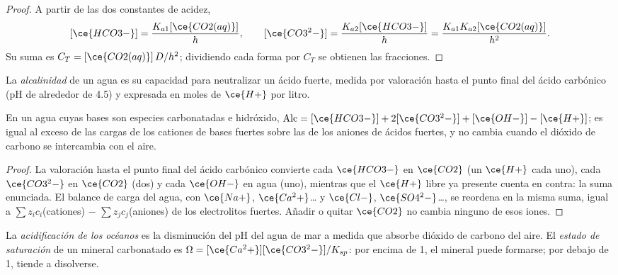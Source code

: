 \begin{proof}
A partir de las dos constantes de acidez,
\[
  [\ce{HCO3-}] = \frac{K_{a1}[\ce{CO2(aq)}]}{h}, \qquad [\ce{CO3^2-}] = \frac{K_{a2}[\ce{HCO3-}]}{h} = \frac{K_{a1}K_{a2}[\ce{CO2(aq)}]}{h^2}.
\]
Su suma es $C_T = [\ce{CO2(aq)}]\,D/h^2$; dividiendo cada forma por $C_T$ se obtienen las fracciones.
\end{proof}

\begin{definition}[Alcalinidad]\label{def:b3:environmental-toxicology:alkalinity}
La \emph{alcalinidad} de un agua es su capacidad para neutralizar
un ácido fuerte, medida por valoración hasta el punto final del ácido carbónico (pH de alrededor
de 4.5) y expresada en moles de $\ce{H+}$ por litro.
\end{definition}

\begin{proposition}\label{prop:b3:environmental-toxicology:alkalinity}
En un agua cuyas bases son especies carbonatadas e hidróxido,
$\mathrm{Alc} = [\ce{HCO3-}] + 2[\ce{CO3^2-}] + [\ce{OH-}] - [\ce{H+}]$; es igual al exceso de las cargas de los cationes de bases fuertes
sobre las de los aniones de ácidos fuertes, y no cambia cuando el dióxido de carbono
se intercambia con el aire.
\end{proposition}

\begin{proof}
La valoración hasta el punto final del ácido carbónico convierte cada $\ce{HCO3-}$ en $\ce{CO2}$ (un $\ce{H+}$ cada uno),
cada $\ce{CO3^2-}$ en $\ce{CO2}$ (dos) y cada $\ce{OH-}$ en agua (uno), mientras que el $\ce{H+}$ libre ya presente
cuenta en contra: la suma enunciada. El balance de carga del agua, con
$\ce{Na+}$, $\ce{Ca^2+}$\dots{} y $\ce{Cl-}$, $\ce{SO4^2-}$\dots, se reordena en la misma suma, igual a $\sum z_i c_i$(cationes) $-$ $\sum z_jc_j$(aniones)
de los electrolitos fuertes. Añadir o quitar $\ce{CO2}$ no cambia ninguno de esos iones.
\end{proof}

\begin{definition}\label{def:b3:environmental-toxicology:acidification}
La \emph{acidificación de los océanos} es la disminución del
pH del agua de mar a medida que absorbe dióxido de carbono del aire. El \emph{estado de
saturación} de un mineral carbonatado es
$\Omega = [\ce{Ca^2+}][\ce{CO3^2-}]/K_{sp}$: por encima de 1, el mineral puede formarse; por debajo de 1, tiende a disolverse.
\end{definition}

